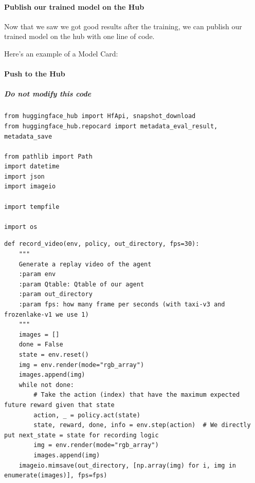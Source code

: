 \documentclass[11pt,a4paper]{article}
\begin{document}
\paragraph{Publish our trained model on the Hub}\label{publish-our-trained-model-on-the-hub}

Now that we saw we got good results after the training, we can publish our trained model on the hub with one line of code.

Here's an example of a Model Card:


\paragraph{Push to the Hub}\label{push-to-the-hub}

\subparagraph{Do not modify this code}\label{do-not-modify-this-code}

\begin{lstlisting}
from huggingface_hub import HfApi, snapshot_download
from huggingface_hub.repocard import metadata_eval_result, metadata_save

from pathlib import Path
import datetime
import json
import imageio

import tempfile

import os
\end{lstlisting}

\begin{lstlisting}
def record_video(env, policy, out_directory, fps=30):
    """
    Generate a replay video of the agent
    :param env
    :param Qtable: Qtable of our agent
    :param out_directory
    :param fps: how many frame per seconds (with taxi-v3 and frozenlake-v1 we use 1)
    """
    images = []
    done = False
    state = env.reset()
    img = env.render(mode="rgb_array")
    images.append(img)
    while not done:
        # Take the action (index) that have the maximum expected future reward given that state
        action, _ = policy.act(state)
        state, reward, done, info = env.step(action)  # We directly put next_state = state for recording logic
        img = env.render(mode="rgb_array")
        images.append(img)
    imageio.mimsave(out_directory, [np.array(img) for i, img in enumerate(images)], fps=fps)
\end{lstlisting}
\end{document}

